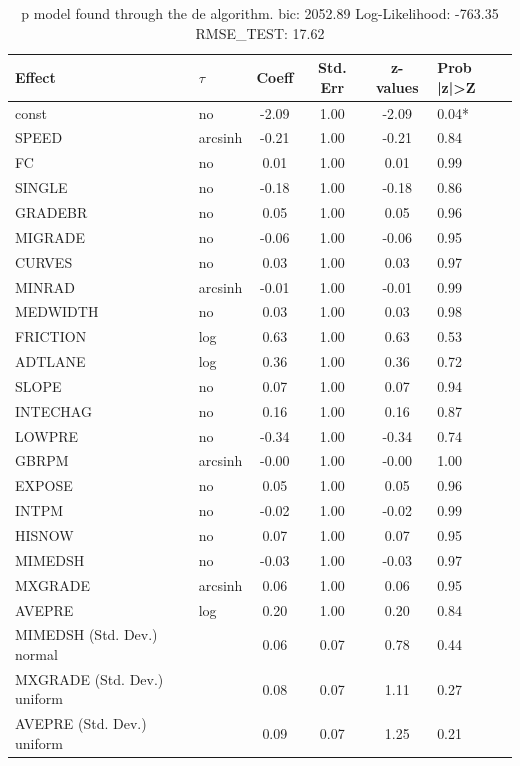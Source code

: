 \begin{table}
	\caption{p model found through the de algorithm. bic: 2052.89 Log-Likelihood: -763.35 RMSE_TEST: 17.62}
	\begin{center}
		\begin{tabular}{|l|l|c|c|c|l|}
			\hline
			Effect & $\tau$ & Coeff & Std. Err & z-values & Prob |z|>Z \\
			\hline
			const & no & -2.09 & 1.00 & -2.09 & 0.04* \\
			\hline
			SPEED & arcsinh & -0.21 & 1.00 & -0.21 & 0.84 \\
			\hline
			FC & no & 0.01 & 1.00 & 0.01 & 0.99 \\
			\hline
			SINGLE & no & -0.18 & 1.00 & -0.18 & 0.86 \\
			\hline
			GRADEBR & no & 0.05 & 1.00 & 0.05 & 0.96 \\
			\hline
			MIGRADE & no & -0.06 & 1.00 & -0.06 & 0.95 \\
			\hline
			CURVES & no & 0.03 & 1.00 & 0.03 & 0.97 \\
			\hline
			MINRAD & arcsinh & -0.01 & 1.00 & -0.01 & 0.99 \\
			\hline
			MEDWIDTH & no & 0.03 & 1.00 & 0.03 & 0.98 \\
			\hline
			FRICTION & log & 0.63 & 1.00 & 0.63 & 0.53 \\
			\hline
			ADTLANE & log & 0.36 & 1.00 & 0.36 & 0.72 \\
			\hline
			SLOPE & no & 0.07 & 1.00 & 0.07 & 0.94 \\
			\hline
			INTECHAG & no & 0.16 & 1.00 & 0.16 & 0.87 \\
			\hline
			LOWPRE & no & -0.34 & 1.00 & -0.34 & 0.74 \\
			\hline
			GBRPM & arcsinh & -0.00 & 1.00 & -0.00 & 1.00 \\
			\hline
			EXPOSE & no & 0.05 & 1.00 & 0.05 & 0.96 \\
			\hline
			INTPM & no & -0.02 & 1.00 & -0.02 & 0.99 \\
			\hline
			HISNOW & no & 0.07 & 1.00 & 0.07 & 0.95 \\
			\hline
			MIMEDSH & no & -0.03 & 1.00 & -0.03 & 0.97 \\
			\hline
			MXGRADE & arcsinh & 0.06 & 1.00 & 0.06 & 0.95 \\
			\hline
			AVEPRE & log & 0.20 & 1.00 & 0.20 & 0.84 \\
			\hline
			MIMEDSH (Std. Dev.) normal &  & 0.06 & 0.07 & 0.78 & 0.44 \\
			\hline
			MXGRADE (Std. Dev.) uniform &  & 0.08 & 0.07 & 1.11 & 0.27 \\
			\hline
			AVEPRE (Std. Dev.) uniform &  & 0.09 & 0.07 & 1.25 & 0.21 \\
			\hline
		\end{tabular}
	\end{center}
\end{table}